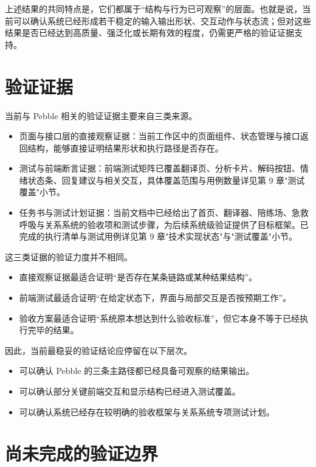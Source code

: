 上述结果的共同特点是，它们都属于“结构与行为已可观察”的层面。也就是说，当前可以确认系统已经形成若干稳定的输入输出形状、交互动作与状态流；但对这些结果是否已经达到高质量、强泛化或长期有效的程度，仍需更严格的验证证据支持。

\section{验证证据}

当前与 Pebble 相关的验证证据主要来自三类来源。

\begin{itemize}
  \item 页面与接口层的直接观察证据：当前工作区中的页面组件、状态管理与接口返回结构，能够直接证明结果形状和执行路径是否存在。
  \item 测试与前端断言证据：前端测试矩阵已覆盖翻译页、分析卡片、解码按钮、情绪状态条、回复建议与相关交互，具体覆盖范围与用例数量详见第 9 章"测试覆盖"小节。
  \item 任务书与测试计划证据：当前文档中已经给出了首页、翻译器、陪练场、急救呼吸与关系系统的验收项和测试步骤，为后续系统级验证提供了目标框架。已完成的执行清单与测试用例详见第 9 章"技术实现状态"与"测试覆盖"小节。
\end{itemize}

这三类证据的验证力度并不相同。

\begin{itemize}
  \item 直接观察证据最适合证明“是否存在某条链路或某种结果结构”。
  \item 前端测试最适合证明“在给定状态下，界面与局部交互是否按预期工作”。
  \item 验收方案最适合证明“系统原本想达到什么验收标准”，但它本身不等于已经执行完毕的结果。
\end{itemize}

因此，当前最稳妥的验证结论应停留在以下层次。

\begin{itemize}
  \item 可以确认 Pebble 的三条主路径都已经具备可观察的结果输出。
  \item 可以确认部分关键前端交互和显示结构已经进入测试覆盖。
  \item 可以确认系统已经存在较明确的验收框架与关系系统专项测试计划。
\end{itemize}

\section{尚未完成的验证边界}

